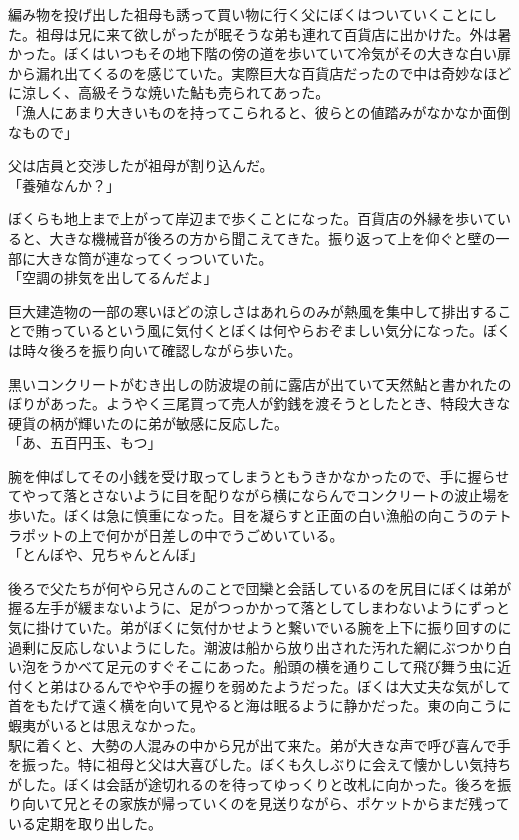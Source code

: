 \documentclass[b5j,twoside,twocolumn]{utarticle}
\begin{document}
編み物を投げ出した祖母も誘って買い物に行く父にぼくはついていくことにした。祖母は兄に来て欲しがったが眠そうな弟も連れて百貨店に出かけた。外は暑かった。ぼくはいつもその地下階の傍の道を歩いていて冷気がその大きな白い扉から漏れ出てくるのを感じていた。実際巨大な百貨店だったので中は奇妙なほどに涼しく、高級そうな焼いた鮎も売られてあった。\\
「漁人にあまり大きいものを持ってこられると、彼らとの値踏みがなかなか面倒なもので」


父は店員と交渉したが祖母が割り込んだ。\\
「養殖なんか？」


ぼくらも地上まで上がって岸辺まで歩くことになった。百貨店の外縁を歩いていると、大きな機械音が後ろの方から聞こえてきた。振り返って上を仰ぐと壁の一部に大きな筒が連なってくっついていた。\\
「空調の排気を出してるんだよ」


巨大建造物の一部の寒いほどの涼しさはあれらのみが熱風を集中して排出することで賄っているという風に気付くとぼくは何やらおぞましい気分になった。ぼくは時々後ろを振り向いて確認しながら歩いた。


黒いコンクリートがむき出しの防波堤の前に露店が出ていて天然鮎と書かれたのぼりがあった。ようやく三尾買って売人が釣銭を渡そうとしたとき、特段大きな硬貨の柄が輝いたのに弟が敏感に反応した。\\
「あ、五百円玉、もつ」


腕を伸ばしてその小銭を受け取ってしまうともうきかなかったので、手に握らせてやって落とさないように目を配りながら横にならんでコンクリートの波止場を歩いた。ぼくは急に慎重になった。目を凝らすと正面の白い漁船の向こうのテトラポットの上で何かが日差しの中でうごめいている。\\
「とんぼや、兄ちゃんとんぼ」


後ろで父たちが何やら兄さんのことで団欒と会話しているのを尻目にぼくは弟が握る左手が緩まないように、足がつっかかって落としてしまわないようにずっと気に掛けていた。弟がぼくに気付かせようと繋いでいる腕を上下に振り回すのに過剰に反応しないようにした。潮波は船から放り出された汚れた網にぶつかり白い泡をうかべて足元のすぐそこにあった。船頭の横を通りこして飛び舞う虫に近付くと弟はひるんでやや手の握りを弱めたようだった。ぼくは大丈夫な気がして首をもたげて遠く横を向いて見やると海は眠るように静かだった。東の向こうに蝦夷がいるとは思えなかった。\\



駅に着くと、大勢の人混みの中から兄が出て来た。弟が大きな声で呼び喜んで手を振った。特に祖母と父は大喜びした。ぼくも久しぶりに会えて懐かしい気持ちがした。ぼくは会話が途切れるのを待ってゆっくりと改札に向かった。後ろを振り向いて兄とその家族が帰っていくのを見送りながら、ポケットからまだ残っている定期を取り出した。
\end{document}
